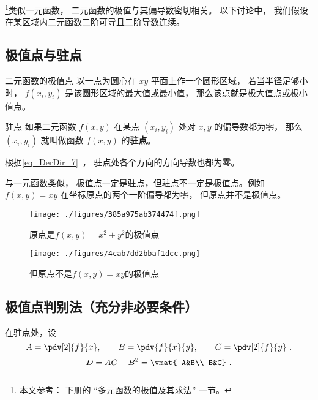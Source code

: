 

\footnote{本文参考： \cite{同济高} 下册的 “多元函数的极值及其求法” 一节。}类似一元函数， 二元函数的极值与其偏导数密切相关。 以下讨论中， 我们假设在某区域内二元函数二阶可导且二阶导数连续。

\subsection{极值点与驻点}
\begin{definition}{二元函数的极值点}
以一点为圆心在 $xy$ 平面上作一个圆形区域， 若当半径足够小时， $f(x_i, y_i)$ 是该圆形区域的最大值或最小值， 那么该点就是极大值点或极小值点。 
\end{definition}

\begin{definition}{驻点}
如果二元函数 $f(x,y)$ 在某点 $(x_i, y_i)$ 处对 $x, y$ 的偏导数都为零， 那么 $(x_i, y_i)$ 就叫做函数 $f(x,y)$ 的\textbf{驻点}。 
\end{definition}
根据\autoref{eq_DerDir_7}~， 驻点处各个方向的方向导数也都为零。
\begin{equation}

\end{equation}

与一元函数类似， 极值点一定是驻点，但驻点不一定是极值点。例如 $f(x,y) = xy$ 在坐标原点的两个一阶偏导都为零， 但原点并不是极值点。 

\begin{figure}[ht]
\centering
\texttt{[image: ./figures/385a975ab374474f.png]}
\caption{原点是$f(x,y)=x^2+y^2$的极值点} \label{fig_F2Exm_1}
\end{figure}


\begin{figure}[ht]
\centering
\texttt{[image: ./figures/4cab7dd2bbaf1dcc.png]}
\caption{但原点不是$f(x,y)=xy$的极值点} \label{fig_F2Exm_2}
\end{figure}

\subsection{极值点判别法（充分非必要条件）}
在驻点处，设
\begin{equation}
A=\pdv[2]{f}{x},\qquad B=\pdv{f}{x}{y},\qquad C=\pdv[2]{f}{y}~.
\end{equation}
\begin{equation}
D=AC-B^2=
\vmat{
A&B\\
B&C}~.
\end{equation}

